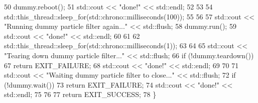 \begin{DoxyCodeInclude}
50     dummy.reboot();
51     std::cout << \textcolor{stringliteral}{"done!"} << std::endl;
52 
53 
54     std::this\_thread::sleep\_for(std::chrono::milliseconds(100));
55 
56 
57     std::cout << \textcolor{stringliteral}{"Running dummy particle filter again..."} << std::flush;
58     dummy.run();
59     std::cout << \textcolor{stringliteral}{"done!"} << std::endl;
60 
61 
62     std::this\_thread::sleep\_for(std::chrono::milliseconds(1));
63 
64 
65     std::cout << \textcolor{stringliteral}{"Tearing down dummy particle filter..."} << std::flush;
66     \textcolor{keywordflow}{if} (!dummy.teardown())
67         \textcolor{keywordflow}{return} EXIT\_FAILURE;
68     std::cout << \textcolor{stringliteral}{"done!"} << std::endl;
69 
70 
71     std::cout << \textcolor{stringliteral}{"Waiting dummy particle filter to close..."} << std::flush;
72     \textcolor{keywordflow}{if} (!dummy.wait())
73         \textcolor{keywordflow}{return} EXIT\_FAILURE;
74     std::cout << \textcolor{stringliteral}{"done!"} << std::endl;
75 
76 
77     \textcolor{keywordflow}{return} EXIT\_SUCCESS;
78 \}
\end{DoxyCodeInclude}
 